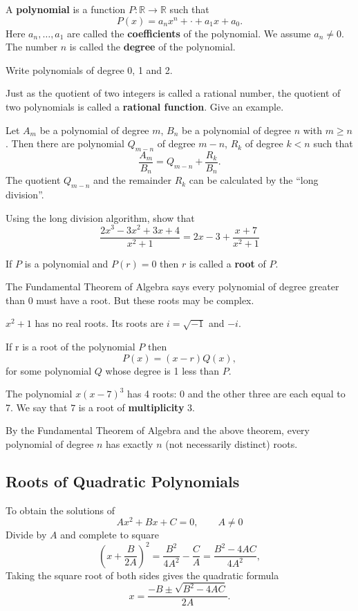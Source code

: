 \documentclass[../main.tex]{subfiles}
\begin{document}
\begin{definition}
  A \textbf{polynomial} is a function $P: \mathbb{R} \to \mathbb{R}$ such that
  \[
    P(x) = a_n x^n + \cdot + a_1 x + a_0.
  \]
  Here $a_n, \dots, a_1$ are called the \textbf{coefficients} of the polynomial. We assume $a_n \neq 0$. The number $n$ is called the \textbf{degree} of the polynomial.
\end{definition}

\begin{example}
  Write polynomials of degree 0, 1 and 2.
\end{example}

Just as the quotient of two integers is called a rational number, the quotient of two polynomials is called a \textbf{rational function}. Give an example.

Let $A_m$ be a polynomial of degree $m$, $B_n$ be a polynomial of degree $n$ with $m\ge n$. Then there are polynomial $Q_{m-n}$ of degree $m-n$, $R_k$ of degree $k<n$ such that
\[
  \frac{A_m}{B_n} = Q_{m-n} + \frac{R_k}{B_n}.
\]
The quotient $Q_{m-n}$ and the remainder $R_k$ can be calculated by the ``long division''.
\begin{example}
  Using the long division algorithm, show that
  \[
    \frac{2x^3-3x^2+3x+4}{x^2+1} = 2x-3 + \frac{x+7}{x^2+1}
  \]
\end{example}

If $P$ is a polynomial and $P(r) = 0$ then $r$ is called a \textbf{root} of $P$.

The Fundamental Theorem of Algebra says every polynomial of degree greater than 0 must have a root. But these roots may be complex.
\begin{example}
  $x^2+1$ has no real roots. Its roots are $i=\sqrt{-1}$ and $-i$.
\end{example}

\begin{theorem}
  If r is a root of the polynomial $P$ then
  \[
    P(x) = (x-r) Q(x),
  \]
  for some polynomial $Q$ whose degree is 1 less than $P$.
\end{theorem}

The polynomial $x(x-7)^3$ has 4 roots: 0 and the other three are each equal to 7. We say that $7$ is a root of \textbf{multiplicity} $3$.

By the Fundamental Theorem of Algebra and the above theorem, every polynomial of degree $n$ has exactly $n$ (not necessarily distinct) roots.

\subsection*{Roots of Quadratic Polynomials}
To obtain the solutions of
\[
  A x^2 + B x + C = 0, \qquad A \neq 0
\]
Divide by $A$ and complete to square
\[
  \left(x + \frac{B}{2A}\right)^2 = \frac{B^2}{4A^2} - \frac{C}{A} = \frac{B^2-4AC}{4A^2},
\]
Taking the square root of both sides gives the quadratic formula
\[
  x = \frac{-B \pm \sqrt{B^2 - 4AC}}{2A}.
\]
\end{document}
